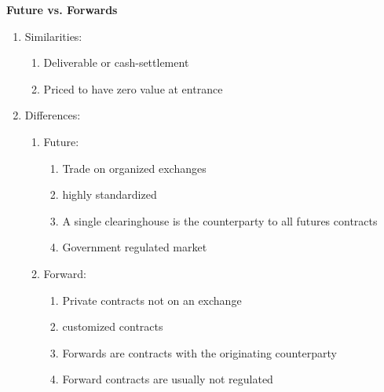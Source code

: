 \documentclass[11pt,fleqn]{book} %
\numberwithin{equation}{section} %
\numberwithin{figure}{section} %
\numberwithin{table}{section} %
\begin{document}
\begin{definition}\textbf{Future vs. Forwards}
\begin{enumerate}
    \item Similarities:
    \begin{enumerate}
        \item Deliverable or cash-settlement
        \item Priced to have zero value at entrance
    \end{enumerate}
    \item Differences:
    \begin{enumerate}
        \item Future:
        \begin{enumerate}
            \item Trade on organized exchanges
            \item highly standardized
            \item A single clearinghouse is the counterparty to all futures contracts
            \item Government regulated market
        \end{enumerate}
        \item Forward:
        \begin{enumerate}
            \item Private contracts not on an exchange
            \item customized contracts
            \item Forwards are contracts with the originating counterparty
            \item Forward contracts are usually not regulated
        \end{enumerate}
    \end{enumerate}
\end{enumerate}
\end{definition}
\end{document}
